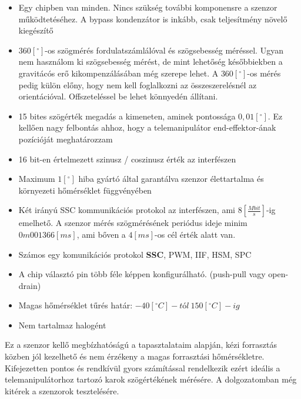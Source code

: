 \begin{itemize}
	\item Egy chipben van minden. Nincs szükség további komponensre a szenzor működtetéséhez. A bypass kondenzátor is inkább, csak teljesítmény növelő kiegészítő
	\item $360[^\circ]$-os szögmérés fordulatszámlálóval és szögsebesség méréssel. Ugyan nem használom ki szögsebesség mérést, de mint lehetőség későbbiekben a gravitácós erő kikompenzálásában még szerepe lehet. A $360[^\circ]$-os mérés pedig külön előny, hogy nem kell foglalkozni az összeszerelésnél az orientációval. Offszeteléssel be lehet könnyedén állítani.
	\item 15 bites szögérték megadás a kimeneten, aminek pontossága $0,01[^\circ]$. Ez kellően nagy felbontás ahhoz, hogy a telemanipulátor end-effektor-ának pozícióját meghatározzam
	\item 16 bit-en értelmezett szinusz / coszinusz érték az interfészen
	\item Maximum $1[^\circ]$ hiba gyártó által garantálva szenzor élettartalma és környezeti hőmérséklet függvényében
	\item Két irányú SSC kommunikációs protokol az interfészen, ami $8[\frac{Mbit}{s}]$-ig emelhető. A szenzor mérés szögmérésének periódus ideje minim $0m001366[ms]$, ami bőven a $4[ms]$-os cél érték alatt van.
	\item Számos egy komunikációs protokol \textbf{SSC}, PWM, IIF, HSM, SPC
	\item A chip választó pin több féle képpen konfigurálható. (push-pull vagy open-drain)
 	\item Magas hőmérséklet tűrés határ: $-40[^\circ C]-tól~150[^\circ C]-ig$
	\item Nem tartalmaz halogént
\end{itemize}

Ez a szenzor kellő megbízhatóságú a tapasztalataim alapján, kézi forrasztás közben jól kezelhető és nem érzékeny a magas forrasztási hőmérsékletre. Kifejezetten pontos és rendkívül gyors számítással rendelkezik ezért ideális a telemanipulátorhoz tartozó karok szögértékének mérésére. A dolgozatomban még kitérek a szenzorok tesztelésére.


